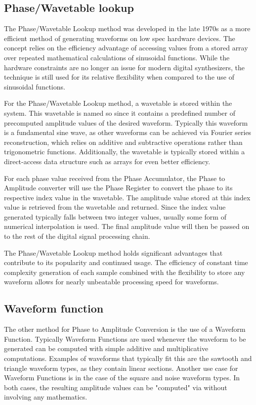 \documentclass[a4paper,12pt]{report}
\begin{document}
\subsection{Phase/Wavetable lookup}
\label{subsec:phasewavetablelookup}
The Phase/Wavetable Lookup method was developed in the late 1970s as a more efficient method of generating waveforms on low spec hardware devices. The concept relies on the efficiency advantage of accessing values from a stored array over repeated mathematical calculations of sinusoidal functions. While the hardware constraints are no longer an issue for modern digital synthesizers, the technique is still used for its relative flexibility when compared to the use of sinusoidal functions.

For the Phase/Wavetable Lookup method, a wavetable is stored within the system. This wavetable is named so since it contains a predefined number of precomputed amplitude values of the desired waveform. Typically this waveform is a fundamental sine wave, as other waveforms can be achieved via Fourier series reconstruction, which relies on additive and subtractive operations rather than trigonometric functions. Additionally, the wavetable is typically stored within a direct-access data structure such as arrays for even better efficiency.


For each phase value received from the Phase Accumulator, the Phase to Amplitude converter will use the Phase Register to convert the phase to its respective index value in the wavetable. The amplitude value stored at this index value is retrieved from the wavetable and returned. Since the index value generated typically falls between two integer values, usually some form of numerical interpolation is used. The final amplitude value will then be passed on to the rest of the digital signal processing chain.

The Phase/Wavetable Lookup method holds significant advantages that contribute to its popularity and continued usage. The efficiency of constant time complexity generation of each sample combined with the flexibility to store any waveform allows for nearly unbeatable processing speed for waveforms.

\subsection{Waveform function}
\label{subsec:waveformfunction}
The other method for Phase to Amplitude Conversion is the use of a Waveform Function. Typically Waveform Functions are used whenever the waveform to be generated can be computed with simple additive and multiplicative computations. Examples of waveforms that typically fit this are the sawtooth and triangle waveform types, as they contain linear sections. Another use case for Waveform Functions is in the case of the square and noise waveform types. In both cases, the resulting amplitude values can be "computed" via without involving any mathematics.
\end{document}
